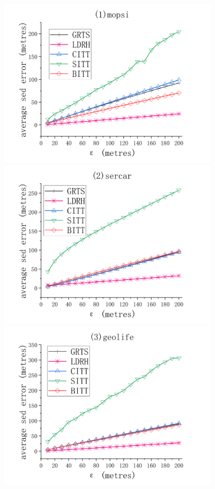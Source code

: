 {\begin{figure}[tb!]
	\centering
	\includegraphics[scale = 0.580]{figures/Fig-mopsi-sed-error.png}\hspace{-1ex}
	\includegraphics[scale = 0.580]{figures/Fig-sercar-sed-error.png}\hspace{-1ex}
	\includegraphics[scale = 0.580]{figures/Fig-geolife-sed-error.png}\hspace{0ex}

\end{figure}}
